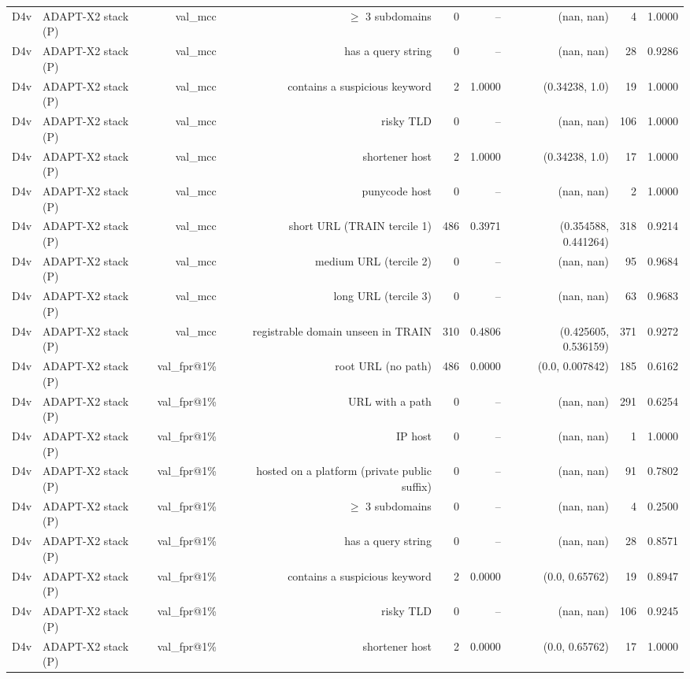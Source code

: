 \begin{table}[t]
\begin{tabular}{llrrrrrrr}
D4v & ADAPT-X2 stack (P) & val\_mcc & $\geq$ 3 subdomains & 0 & -- & (nan, nan) & 4 & 1.0000 \\
D4v & ADAPT-X2 stack (P) & val\_mcc & has a query string & 0 & -- & (nan, nan) & 28 & 0.9286 \\
D4v & ADAPT-X2 stack (P) & val\_mcc & contains a suspicious keyword & 2 & 1.0000 & (0.34238, 1.0) & 19 & 1.0000 \\
D4v & ADAPT-X2 stack (P) & val\_mcc & risky TLD & 0 & -- & (nan, nan) & 106 & 1.0000 \\
D4v & ADAPT-X2 stack (P) & val\_mcc & shortener host & 2 & 1.0000 & (0.34238, 1.0) & 17 & 1.0000 \\
D4v & ADAPT-X2 stack (P) & val\_mcc & punycode host & 0 & -- & (nan, nan) & 2 & 1.0000 \\
D4v & ADAPT-X2 stack (P) & val\_mcc & short URL (TRAIN tercile 1) & 486 & 0.3971 & (0.354588, 0.441264) & 318 & 0.9214 \\
D4v & ADAPT-X2 stack (P) & val\_mcc & medium URL (tercile 2) & 0 & -- & (nan, nan) & 95 & 0.9684 \\
D4v & ADAPT-X2 stack (P) & val\_mcc & long URL (tercile 3) & 0 & -- & (nan, nan) & 63 & 0.9683 \\
D4v & ADAPT-X2 stack (P) & val\_mcc & registrable domain unseen in TRAIN & 310 & 0.4806 & (0.425605, 0.536159) & 371 & 0.9272 \\
D4v & ADAPT-X2 stack (P) & val\_fpr@1\% & root URL (no path) & 486 & 0.0000 & (0.0, 0.007842) & 185 & 0.6162 \\
D4v & ADAPT-X2 stack (P) & val\_fpr@1\% & URL with a path & 0 & -- & (nan, nan) & 291 & 0.6254 \\
D4v & ADAPT-X2 stack (P) & val\_fpr@1\% & IP host & 0 & -- & (nan, nan) & 1 & 1.0000 \\
D4v & ADAPT-X2 stack (P) & val\_fpr@1\% & hosted on a platform (private public suffix) & 0 & -- & (nan, nan) & 91 & 0.7802 \\
D4v & ADAPT-X2 stack (P) & val\_fpr@1\% & $\geq$ 3 subdomains & 0 & -- & (nan, nan) & 4 & 0.2500 \\
D4v & ADAPT-X2 stack (P) & val\_fpr@1\% & has a query string & 0 & -- & (nan, nan) & 28 & 0.8571 \\
D4v & ADAPT-X2 stack (P) & val\_fpr@1\% & contains a suspicious keyword & 2 & 0.0000 & (0.0, 0.65762) & 19 & 0.8947 \\
D4v & ADAPT-X2 stack (P) & val\_fpr@1\% & risky TLD & 0 & -- & (nan, nan) & 106 & 0.9245 \\
D4v & ADAPT-X2 stack (P) & val\_fpr@1\% & shortener host & 2 & 0.0000 & (0.0, 0.65762) & 17 & 1.0000 \\

\end{tabular}
\end{table}
